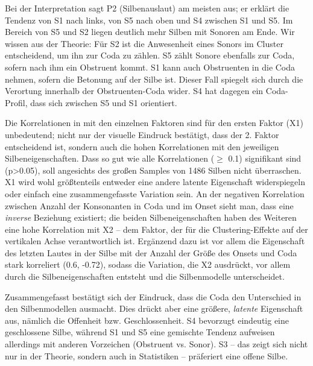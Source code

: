 \documentclass[12pt,headsepline,a4paper]{scrartcl}
\begin{document}
Bei der Interpretation sagt P2 (Silbenauslaut) am meisten aus; er erklärt die Tendenz von S1 nach links, von S5 nach oben und S4 zwischen S1 und S5. Im Bereich von S5 und S2 liegen deutlich mehr Silben mit Sonoren am Ende. Wir wissen aus der Theorie: Für S2 ist die Anwesenheit eines Sonors im Cluster entscheidend, um ihn zur Coda zu zählen. S5 zählt Sonore ebenfalls zur Coda, sofern nach ihm ein Obstruent kommt. S1 kann auch Obstruenten in die Coda nehmen, sofern die Betonung auf der Silbe ist. Dieser Fall spiegelt sich durch die Verortung innerhalb der Obstruenten-Coda wider. S4 hat dagegen ein Coda-Profil, dass sich zwischen S5 und S1 orientiert.

Die Korrelationen in  mit den einzelnen Faktoren sind für den ersten Faktor (X1) unbedeutend; nicht nur der visuelle Eindruck bestätigt, dass der 2. Faktor entscheidend ist, sondern auch die hohen Korrelationen mit den jeweiligen Silbeneigenschaften. Dass so gut wie alle Korrelationen ($\geq$ 0.1) signifikant sind (p>0.05), soll angesichts des großen Samples von 1486 Silben nicht überraschen. X1 wird wohl größtenteils entweder eine andere latente Eigenschaft widerspiegeln oder einfach eine zusammengefasste Variation sein. An der negativen Korrelation zwischen Anzahl der Konsonanten in Coda und im Onset sieht man, dass eine \textit{inverse} Beziehung existiert; die beiden Silbeneigenschaften haben des Weiteren eine hohe Korrelation mit X2 -- dem Faktor, der für die Clustering-Effekte auf der vertikalen Achse verantwortlich ist. Ergänzend dazu ist vor allem die Eigenschaft des letzten Lautes in der Silbe mit der Anzahl der Größe des Onsets und Coda stark korreliert (0.6, -0.72), sodass die Variation, die X2 ausdrückt, vor allem durch die Silbeneigenschaften entsteht und die Silbenmodelle unterscheidet.

Zusammengefasst bestätigt sich der Eindruck, dass die Coda den Unterschied in den Silbenmodellen ausmacht. Dies drückt aber eine größere, \textit{latente} Eigenschaft aus, nämlich die Offenheit bzw. Geschlossenheit. S4 bevorzugt eindeutig eine geschlossene Silbe, während S1 und S5 eine gemischte Tendenz aufweisen allerdings mit anderen Vorzeichen (Obstruent vs. Sonor). S3 -- das zeigt sich nicht nur in der Theorie, sondern auch in Statistiken -- präferiert eine offene Silbe.
\end{document}
